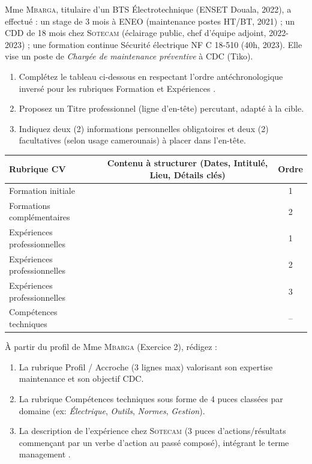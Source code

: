 \documentclass[11pt]{article}
\begin{document}
\begin{exercice}
Mme \textsc{Mbarga}, titulaire d'un BTS Électrotechnique (ENSET Douala, 2022), a effectué : un stage de 3 mois à \textsc{ENEO} (maintenance postes HT/BT, 2021) ; un CDD de 18 mois chez \textsc{Sotecam} (éclairage public, chef d'équipe adjoint, 2022-2023) ; une formation continue \og Sécurité électrique NF C 18-510 \fg{} (40h, 2023). Elle vise un poste de \textit{Chargée de maintenance préventive} à \textsc{CDC} (Tiko).
\begin{enumerate}
    \item Complétez le tableau ci-dessous en respectant l'ordre antéchronologique inversé pour les rubriques \og Formation \fg{} et \og Expériences \fg{}.
    \item Proposez un \og Titre professionnel \fg{} (ligne d'en-tête) percutant, adapté à la cible.
    \item Indiquez deux (2) informations personnelles obligatoires et deux (2) facultatives (selon usage camerounais) à placer dans l'en-tête.
\end{enumerate}

\begin{tabularx}{\linewidth}{|X|c|c|}
\hline
\textbf{Rubrique CV} & \textbf{Contenu à structurer (Dates, Intitulé, Lieu, Détails clés)} & \textbf{Ordre} \\
\hline
Formation initiale &  & 1 \\
\hline
Formations complémentaires &  & 2 \\
\hline
Expériences professionnelles &  & 1 \\
\hline
Expériences professionnelles &  & 2 \\
\hline
Expériences professionnelles &  & 3 \\
\hline
Compétences techniques &  & -- \\
\hline
\end{tabularx}
\end{exercice}

\begin{exercice}
À partir du profil de Mme \textsc{Mbarga} (Exercice 2), rédigez :
\begin{enumerate}
    \item La rubrique \og Profil / Accroche \fg{} (3 lignes max) valorisant son expertise maintenance et son objectif CDC.
    \item La rubrique \og Compétences techniques \fg{} sous forme de 4 puces classées par domaine (ex: \textit{Électrique}, \textit{Outils}, \textit{Normes}, \textit{Gestion}).
    \item La description de l'expérience chez \textsc{Sotecam} (3 puces d'actions/résultats commençant par un verbe d'action au passé composé), intégrant le terme \og management \fg{}.
\end{enumerate}
\end{exercice}
\end{document}
